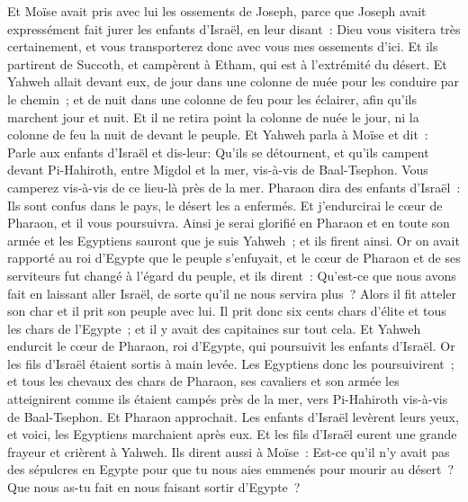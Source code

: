 \begin{multicols}{2}
Et Moïse avait pris avec lui les ossements de Joseph, parce que Joseph avait expressément fait jurer les enfants d'Israël, en leur disant~: Dieu vous visitera très certainement, et vous transporterez donc avec vous mes ossements d'ici.
Et ils partirent de Succoth, et campèrent à Etham, qui est à l'extrémité du désert.
Et Yahweh allait devant eux, de jour dans une colonne de nuée pour les conduire par le chemin~; et de nuit dans une colonne de feu pour les éclairer, afin qu'ils marchent jour et nuit.
Et il ne retira point la colonne de nuée le jour, ni la colonne de feu la nuit de devant le peuple.
\VerseOne{}Et Yahweh parla à Moïse et dit~:
Parle aux enfants d'Israël et dis-leur: Qu'ils se détournent, et qu'ils campent devant Pi-Hahiroth, entre Migdol et la mer, vis-à-vis de Baal-Tsephon. Vous camperez vis-à-vis de ce lieu-là près de la mer.
Pharaon dira des enfants d'Israël~: Ils sont confus dans le pays, le désert les a enfermés.
Et j'endurcirai le cœur de Pharaon, et il vous poursuivra. Ainsi je serai glorifié en Pharaon et en toute son armée et les Egyptiens sauront que je suis Yahweh~; et ils firent ainsi.
Or on avait rapporté au roi d'Egypte que le peuple s'enfuyait, et le cœur de Pharaon et de ses serviteurs fut changé à l'égard du peuple, et ils dirent~: Qu'est-ce que nous avons fait en laissant aller Israël, de sorte qu'il ne nous servira plus~?
Alors il fit atteler son char et il prit son peuple avec lui.
Il prit donc six cents chars d'élite et tous les chars de l'Egypte~; et il y avait des capitaines sur tout cela.
Et Yahweh endurcit le cœur de Pharaon, roi d'Egypte, qui poursuivit les enfants d'Israël. Or les fils d'Israël étaient sortis à main levée.
Les Egyptiens donc les poursuivirent~; et tous les chevaux des chars de Pharaon, ses cavaliers et son armée les atteignirent comme ils étaient campés près de la mer, vers Pi-Hahiroth vis-à-vis de Baal-Tsephon.
Et Pharaon approchait. Les enfants d'Israël levèrent leurs yeux, et voici, les Egyptiens marchaient après eux. Et les fils d'Israël eurent une grande frayeur et crièrent à Yahweh.
Ils dirent aussi à Moïse~: Est-ce qu'il n'y avait pas des sépulcres en Egypte pour que tu nous aies emmenés pour mourir au désert~? Que nous as-tu fait en nous faisant sortir d'Egypte~?

\end{multicols}

